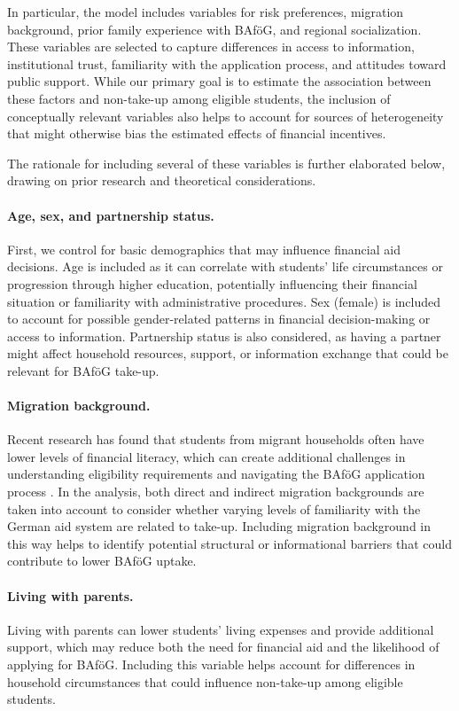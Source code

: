 In particular, the model includes variables for risk preferences, migration background, prior family experience with BAföG, and regional socialization. These variables are selected to capture differences in access to information, institutional trust, familiarity with the application process, and attitudes toward public support. While our primary goal is to estimate the association between these factors and non-take-up among eligible students, the inclusion of conceptually relevant variables also helps to account for sources of heterogeneity that might otherwise bias the estimated effects of financial incentives.

The rationale for including several of these variables is further elaborated below, drawing on prior research and theoretical considerations. 

\paragraph{Age, sex, and partnership status.}
First, we control for basic demographics that may influence financial aid decisions. Age is included as it can correlate with students’ life circumstances or progression through higher education, potentially influencing their financial situation or familiarity with administrative procedures. Sex (female) is included to account for possible gender-related patterns in financial decision-making or access to information. Partnership status is also considered, as having a partner might affect household resources, support, or information exchange that could be relevant for BAföG take-up.

\paragraph{Migration background.}
Recent research has found that students from migrant households often have lower levels of financial literacy, which can create additional challenges in understanding eligibility requirements and navigating the BAföG application process \citep{Tsegay_2024}. In the analysis, both direct and indirect migration backgrounds are taken into account to consider whether varying levels of familiarity with the German aid system are related to take-up. Including migration background in this way helps to identify potential structural or informational barriers that could contribute to lower BAföG uptake.

\paragraph{Living with parents.}
Living with parents can lower students’ living expenses and provide additional support, which may reduce both the need for financial aid and the likelihood of applying for BAföG. Including this variable helps account for differences in household circumstances that could influence non-take-up among eligible students.

